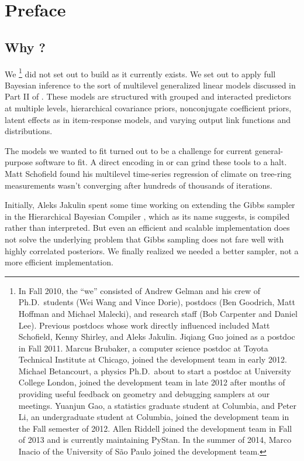 \chapter*{Preface}

\section*{Why \Stan?}

We%
%
\footnote{In Fall 2010, the ``we'' consisted of Andrew Gelman and his
  crew of Ph.D.\ students (Wei Wang and Vince Dorie), postdocs (Ben
  Goodrich, Matt Hoffman and Michael Malecki), and research staff (Bob
  Carpenter and Daniel Lee).  Previous postdocs whose work directly
  influenced \Stan included Matt Schofield, Kenny Shirley, and Aleks
  Jakulin.  Jiqiang Guo joined as a postdoc in Fall 2011.  Marcus
  Brubaker, a computer science postdoc at Toyota Technical Institute
  at Chicago, joined the development team in early 2012.  Michael
  Betancourt, a physics Ph.D.\ about to start a postdoc at University
  College London, joined the development team in late 2012 after
  months of providing useful feedback on geometry and debugging
  samplers at our meetings. Yuanjun Gao, a statistics graduate student at
  Columbia, and Peter Li, an undergraduate student at Columbia,
  joined the development team in the Fall semester of 2012.  Allen
  Riddell joined the development team in Fall of 2013 and is currently
  maintaining PyStan.  In the summer of 2014, Marco Inacio of the
  University of S\~ao Paulo joined the development team.}
%
did not set out to build \Stan as it currently exists.  We set out to
apply full Bayesian inference to the sort of multilevel generalized
linear models discussed in Part II of \citep{GelmanHill:2007}.  These
models are structured with grouped and interacted predictors at
multiple levels, hierarchical covariance priors, nonconjugate
coefficient priors, latent effects as in item-response models, and
varying output link functions and distributions.

The models we wanted to fit turned out to be a challenge for current
general-purpose software to fit.  A direct encoding in \BUGS or \JAGS
can grind these tools to a halt.  Matt Schofield found his multilevel
time-series regression of climate on tree-ring measurements wasn't
converging after hundreds of thousands of iterations.

Initially, Aleks Jakulin spent some time working on extending the
Gibbs sampler in the Hierarchical Bayesian Compiler
\citep{DaumeIII:2007}, which as its name suggests, is compiled rather
than interpreted.  But even an efficient and scalable implementation
does not solve the underlying problem that Gibbs sampling does not
fare well with highly correlated posteriors.  We finally realized we
needed a better sampler, not a more efficient implementation.

